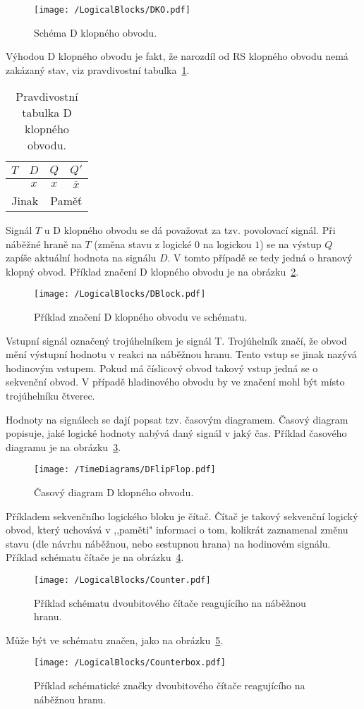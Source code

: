 \documentclass{report}
\begin{document}
\begin{figure}
\centering
\texttt{[image: /LogicalBlocks/DKO.pdf]}
\caption{Schéma D klopného obvodu.}
\label{fig:dko}
\end{figure}
Výhodou D klopného obvodu je fakt, že narozdíl od RS klopného obvodu nemá zakázaný stav, viz pravdivostní tabulka~\ref{tab:dkotab}.
\begin{table}
\centering
 \begin{tabular}{ |c c|c c| } 
   	\hline
	$T$ & $D$ & $Q$ & $Q'$ \\
   	\hline
	\texttiming{LH} & $x$ & $x$ & $\overline{x}$\\
	\multicolumn{2}{|c|}{Jinak} & \multicolumn{2}{|c|}{Paměť}\\
   	\hline
\end{tabular}
	\caption{Pravdivostní tabulka D klopného obvodu.}
	\label{tab:dkotab}
\end{table}
Signál $T$ u D klopného obvodu se dá považovat za tzv. povolovací signál. Při náběžné hraně na $T$  (změna stavu z logické $0$ na logickou $1$) se na výstup $Q$ zapíše aktuální hodnota na signálu $D$. V tomto případě se tedy jedná o hranový klopný obvod. Příklad značení D klopného obvodu je na obrázku~\ref{fig:dblock}.
\begin{figure}
\centering
\texttt{[image: /LogicalBlocks/DBlock.pdf]}
\caption{Příklad značení D klopného obvodu ve schématu.}
\label{fig:dblock}
\end{figure}
Vstupní signál označený trojúhelníkem je signál T. Trojúhelník značí, že obvod mění výstupní hodnotu v reakci na náběžnou hranu. Tento vstup se jinak nazývá hodinovým vstupem. Pokud má číslicový obvod takový vstup jedná se o sekvenční obvod. V případě hladinového obvodu by ve značení mohl být místo trojúhelníku čtverec. \par
Hodnoty na signálech se dají popsat tzv. časovým diagramem. Časový diagram popisuje, jaké logické hodnoty nabývá daný signál v jaký čas. Příklad časového diagramu je na obrázku~\ref{fig:dkotd}.
\begin{figure}
\centering
\texttt{[image: /TimeDiagrams/DFlipFlop.pdf]}
\caption{Časový diagram D klopného obvodu.}
\label{fig:dkotd}
\end{figure}
\par
Příkladem sekvenčního logického bloku je čítač. Čítač je takový sekvenční logický obvod, který uchovává v ,,paměti" informaci o tom, kolikrát zaznamenal změnu stavu (dle návrhu náběžnou, nebo sestupnou hrana) na hodinovém signálu. Příklad schématu čítače je na obrázku~\ref{fig:counter}.
\begin{figure}
\centering
\texttt{[image: /LogicalBlocks/Counter.pdf]}
\caption{Příklad schématu dvoubitového čítače reagujícího na náběžnou hranu.}
\label{fig:counter}
\end{figure}
Může být ve schématu značen, jako na obrázku~\ref{fig:counterbox}.
\begin{figure}
\centering
\texttt{[image: /LogicalBlocks/Counterbox.pdf]}
\caption{Příklad schématické značky dvoubitového čítače reagujícího na náběžnou hranu.}
\label{fig:counterbox}
\end{figure}
\end{document}
